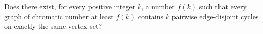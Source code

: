 Does there exist, for every positive integer \(k\), a number \(f(k)\)
such that every graph of chromatic number at least \(f(k)\) contains
\(k\) pairwise edge-disjoint cycles on exactly the same vertex set?

